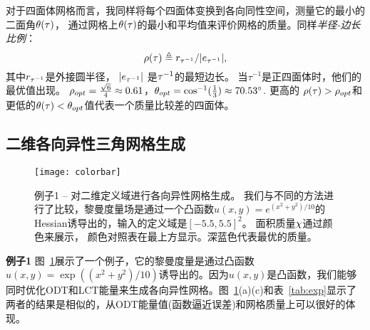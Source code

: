 对于四面体网格而言，我同样将每个四面体变换到各向同性空间，测量它的最小的二面角$\theta(\tau)$， 通过网格上$\theta(\tau)$的最小和平均值来评价网格的质量。同样\emph{半径-边长比例}：
$$\rho(\tau) \triangleq r_{\tau^{-1}}/|e_{\tau^{-1}}|,$$
其中$r_{\tau^{-1}}$是外接圆半径， $|e_{\tau^{-1}}|$ 是${\tau^{-1}}$的最短边长。 当$\tau^{-1}$是正四面体时，他们的最优值出现。 $\rho_{opt} = \frac{\sqrt{6}}{4} \approx 0.61 $，$\theta_{opt} =\cos^{-1}(\frac{1}{3}) \approx 70.53^\circ$. 更高的 $\rho(\tau) > \rho_{opt}$和更低的$\theta(\tau) < \theta_{opt}$值代表一个质量比较差的四面体。

\subsection{二维各向异性三角网格生成}
\begin{figure}[t]
  \centering
  \centerline
  {
    \texttt{[image: colorbar]}
   }
   \vspace{-2mm}
   \centerline{
  }
  \vspace{-2mm}
  \centerline{
}
 \caption{例子1 -- 对二维定义域进行各向异性网格生成。 我们与不同的方法进行了比较，黎曼度量场是通过一个凸函数$u(x,y)=e^{(x^2+y^2)/10}$的Hessian诱导出的，输入的定义域是$[-5.5,5.5]^2$。 面积质量$\chi$通过颜色来展示， 颜色对照表在最上方显示。深蓝色代表最优的质量。}
 \label{fig:exp}
 \vspace{-4mm}
\end{figure}

\textbf{例子1}\quad
图~\ref{fig:exp}展示了一个例子，它的黎曼度量是通过凸函数$u(x,y)=\exp((x^2+y^2)/10)$诱导出的。因为$u(x,y)$是凸函数，我们能够同时优化ODT和LCT能量来生成各向异性网格。图~\ref{fig:exp}(a)(c)和表~\ref{tab:exp}显示了两者的结果是相似的，从ODT能量值(函数逼近误差)和网格质量上可以很好的体现。

